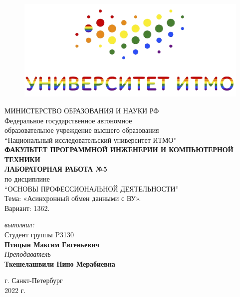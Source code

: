 \begin{center}

	\begin{figure}[H]
	\centering
	\includegraphics[scale=0.7]{img/ITMO_LGBT}
	\end{figure}
	\hfill \break
	МИНИСТЕРСТВО ОБРАЗОВАНИЯ И НАУКИ РФ\\
	\hfill \break
	Федеральное государственное автономное\\
	образовательное учреждение высшего образования\\
	``Национальный исследовательский университет ИТМО''\\
	\hfill \break
	\textbf{ФАКУЛЬТЕТ ПРОГРАММНОЙ ИНЖЕНЕРИИ И КОМПЬЮТЕРНОЙ ТЕХНИКИ}\\
	\vspace{3cm}
	\large{\textbf{ЛАБОРАТОРНАЯ РАБОТА №5}}\\
	\hfill \break
	по дисциплине\\
	\large{``ОСНОВЫ ПРОФЕССИОНАЛЬНОЙ ДЕЯТЕЛЬНОСТИ''}\\
	Тема: «Асинхронный обмен данными с ВУ».\\
	\hfill \break
	Вариант: 1362.
	\vspace{5cm}
	\begin{flushright}
	\textit{выполнил:}\\
	Студент группы P3130\\
	\textbf{Птицын Максим Евгеньевич}\\
	\textit{Преподаватель}\\
	\textbf{Ткешелашвили Нино Мерабиевна}
	\end{flushright}
\end{center}

\vfill


\begin{center} г. Санкт-Петербург\\2022 г.
\end{center}

\thispagestyle{empty}
\newpage